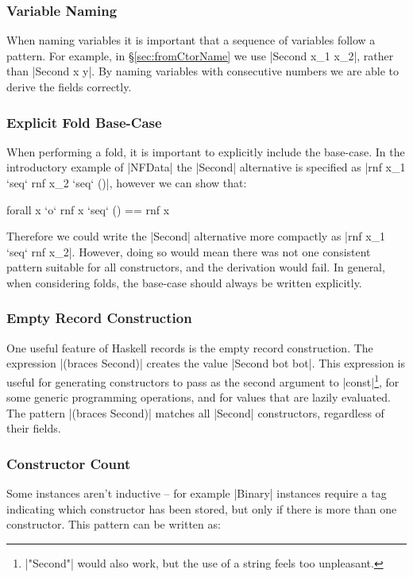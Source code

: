 \documentclass[preprint,draft]{sigplanconf}
\begin{document}
\subsubsection{Variable Naming}

When naming variables it is important that a sequence of variables follow a pattern. For example, in \S\ref{sec:fromCtorName} we use |Second x_1 x_2|, rather than |Second x y|. By naming variables with consecutive numbers we are able to derive the fields correctly.

\subsubsection{Explicit Fold Base-Case}

When performing a fold, it is important to explicitly include the base-case. In the introductory example of |NFData| the |Second| alternative is specified as |rnf x_1 `seq` rnf x_2 `seq` ()|, however we can show that:

\ignore\begin{code}
forall x `o` rnf x `seq` () == rnf x
\end{code}

Therefore we could write the |Second| alternative more compactly as |rnf x_1 `seq` rnf x_2|. However, doing so would mean there was not one consistent pattern suitable for all constructors, and the derivation would fail. In general, when considering folds, the base-case should always be written explicitly.

\subsubsection{Empty Record Construction}

One useful feature of Haskell records is the empty record construction. The expression |(braces Second)| creates the value |Second bot bot|. This expression is useful for generating constructors to pass as the second argument to |const|\footnote{|"Second"| would also work, but the use of a string feels too unpleasant.}, for some generic programming operations, and for values that are lazily evaluated. The pattern |(braces Second)| matches all |Second| constructors, regardless of their fields.

\subsubsection{Constructor Count}

Some instances aren't inductive -- for example |Binary| instances require a tag indicating which constructor has been stored, but only if there is more than one constructor. This pattern can be written as:
\end{document}
